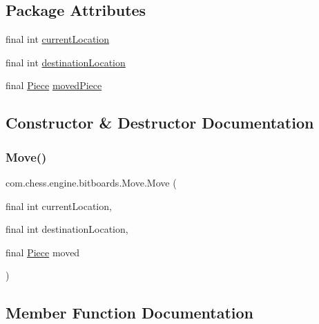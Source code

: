 \subsection*{Package Attributes}
\begin{DoxyCompactItemize}
\item 
final int \mbox{\hyperlink{classcom_1_1chess_1_1engine_1_1bitboards_1_1_move_a21d50223c83db07c62fca6fa70623ed1}{current\+Location}}
\item 
final int \mbox{\hyperlink{classcom_1_1chess_1_1engine_1_1bitboards_1_1_move_ae9432b9156a87e04f3417ba1da2cc7a7}{destination\+Location}}
\item 
final \mbox{\hyperlink{enumcom_1_1chess_1_1engine_1_1bitboards_1_1_bit_board_1_1_piece}{Piece}} \mbox{\hyperlink{classcom_1_1chess_1_1engine_1_1bitboards_1_1_move_aa1935c00c3dfb338e4007b7202b66830}{moved\+Piece}}
\end{DoxyCompactItemize}


\subsection{Constructor \& Destructor Documentation}
\mbox{\label{classcom_1_1chess_1_1engine_1_1bitboards_1_1_move_ae887a943428294c964d6ecfd33a7eb62}} 
\subsubsection{\texorpdfstring{Move()}{Move()}}
{\footnotesize\ttfamily com.\+chess.\+engine.\+bitboards.\+Move.\+Move (\begin{DoxyParamCaption}\item[{final int}]{current\+Location,  }\item[{final int}]{destination\+Location,  }\item[{final \mbox{\hyperlink{enumcom_1_1chess_1_1engine_1_1bitboards_1_1_bit_board_1_1_piece}{Piece}}}]{moved }\end{DoxyParamCaption})}



\subsection{Member Function Documentation}
\mbox{\label{classcom_1_1chess_1_1engine_1_1bitboards_1_1_move_afafd49d74e425e6f2f15b25b37fb2f9e}} 

